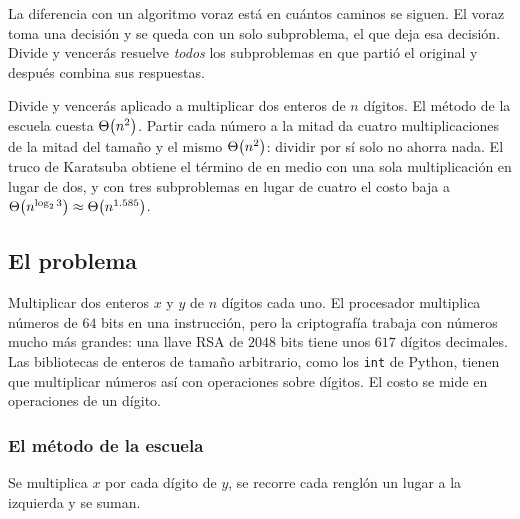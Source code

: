 \documentclass[11pt,letterpaper]{article}
\begin{document}
\begin{idea}
  La diferencia con un algoritmo voraz está en cuántos caminos se
  siguen. El voraz toma una decisión y se queda con un solo
  subproblema, el que deja esa decisión. Divide y vencerás resuelve
  \emph{todos} los subproblemas en que partió el original y después
  combina sus respuestas.
\end{idea}

\newpage



\begin{quick_sum}
  Divide y vencerás aplicado a multiplicar dos enteros de $n$ dígitos.
  El método de la escuela cuesta $\Theta\!\left(n^2\right)$. Partir cada número a la
  mitad da cuatro multiplicaciones de la mitad del tamaño y el mismo
  $\Theta\!\left(n^2\right)$: dividir por sí solo no ahorra nada. El truco de
  Karatsuba obtiene el término de en medio con una sola multiplicación
  en lugar de dos, y con tres subproblemas en lugar de cuatro el costo
  baja a $\Theta\!\left(n^{\log_2 3}\right) \approx \Theta\!\left(n^{1.585}\right)$.
\end{quick_sum}

\subsection*{El problema}

Multiplicar dos enteros $x$ y $y$ de $n$ dígitos cada uno. El
procesador multiplica números de $64$ bits en una instrucción, pero la
criptografía trabaja con números mucho más grandes: una llave RSA de
$2048$ bits tiene unos $617$ dígitos decimales. Las bibliotecas de
enteros de tamaño arbitrario, como los \texttt{int} de Python, tienen
que multiplicar números así con operaciones sobre dígitos. El costo se
mide en operaciones de un dígito.

\subsubsection*{El método de la escuela}

Se multiplica $x$ por cada dígito de $y$, se recorre cada renglón un
lugar a la izquierda y se suman.
\end{document}
